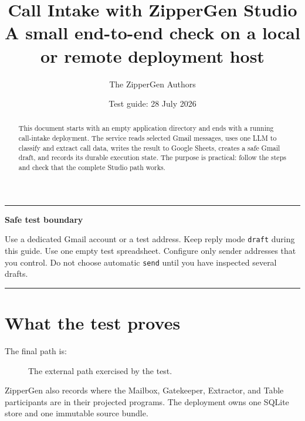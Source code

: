 \documentclass[11pt,a4paper]{article}
\title{\color{ZipperInk}\Huge\textbf{Call Intake with ZipperGen Studio}\\[5pt]
\Large A small end-to-end check on a local or remote deployment host}
\author{The ZipperGen Authors}
\date{Test guide: 28 July 2026}
\newenvironment{notebox}[1]
{\begin{center}\begin{minipage}{0.94\linewidth}
 \color{ZipperInk}\hrule\vspace{5pt}\textbf{#1}\par\smallskip}
{\vspace{5pt}\hrule\end{minipage}\end{center}}
\begin{document}
\maketitle

\begin{abstract}
This document starts with an empty application directory and ends with a
running call-intake deployment. The service reads selected Gmail messages,
uses one LLM to classify and extract call data, writes the result to Google
Sheets, creates a safe Gmail draft, and records its durable execution state.
The purpose is practical: follow the steps and check that the complete Studio
path works.
\end{abstract}

\begin{notebox}{Safe test boundary}
Use a dedicated Gmail account or a test address. Keep reply mode
\texttt{draft} during this guide. Use one empty test spreadsheet. Configure
only sender addresses that you control. Do not choose automatic
\texttt{send} until you have inspected several drafts.
\end{notebox}

\section{What the test proves}

The final path is:

\begin{figure}[htbp]
\centering
{}
\caption{The external path exercised by the test.}
\end{figure}

ZipperGen also records where the Mailbox, Gatekeeper, Extractor, and Table
participants are in their projected programs. The deployment owns one
SQLite store and one immutable source bundle.
\end{document}
